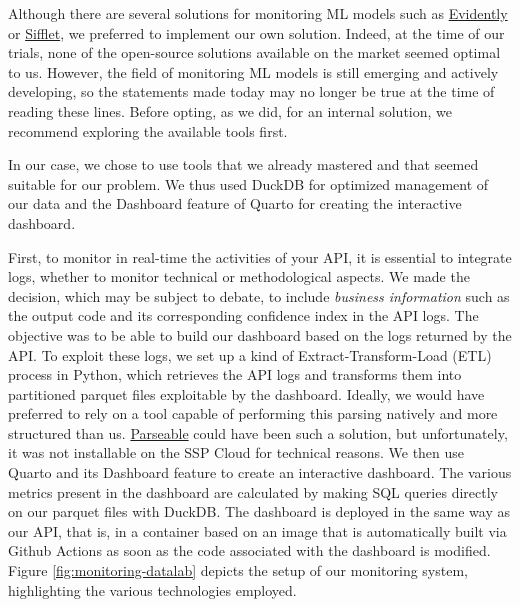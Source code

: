 
Although there are several solutions for monitoring ML models such as \href{https://www.evidentlyai.com/}{Evidently} or \href{https://www.siffletdata.com/}{Sifflet}, we preferred to implement our own solution. Indeed, at the time of our trials, none of the open-source solutions available on the market seemed optimal to us. However, the field of monitoring ML models is still emerging and actively developing, so the statements made today may no longer be true at the time of reading these lines. Before opting, as we did, for an internal solution, we recommend exploring the available tools first.

In our case, we chose to use tools that we already mastered and that seemed suitable for our problem. We thus used DuckDB for optimized management of our data and the Dashboard feature of Quarto for creating the interactive dashboard. 

First, to monitor in real-time the activities of your API, it is essential to integrate logs, whether to monitor technical or methodological aspects. We made the decision, which may be subject to debate, to include \textit{business information} such as the output code and its corresponding confidence index in the API logs. The objective was to be able to build our dashboard based on the logs returned by the API. To exploit these logs, we set up a kind of Extract-Transform-Load (ETL) process in Python, which retrieves the API logs and transforms them into partitioned parquet files exploitable by the dashboard. Ideally, we would have preferred to rely on a tool capable of performing this parsing natively and more structured than us. \href{https://www.parseable.com/}{Parseable} could have been such a solution, but unfortunately, it was not installable on the SSP Cloud for technical reasons. We then use Quarto and its Dashboard feature to create an interactive dashboard. The various metrics present in the dashboard are calculated by making SQL queries directly on our parquet files with DuckDB. The dashboard is deployed in the same way as our API, that is, in a container based on an image that is automatically built via Github Actions as soon as the code associated with the dashboard is modified. Figure \ref{fig:monitoring-datalab} depicts the setup of our monitoring system, highlighting the various technologies employed.

